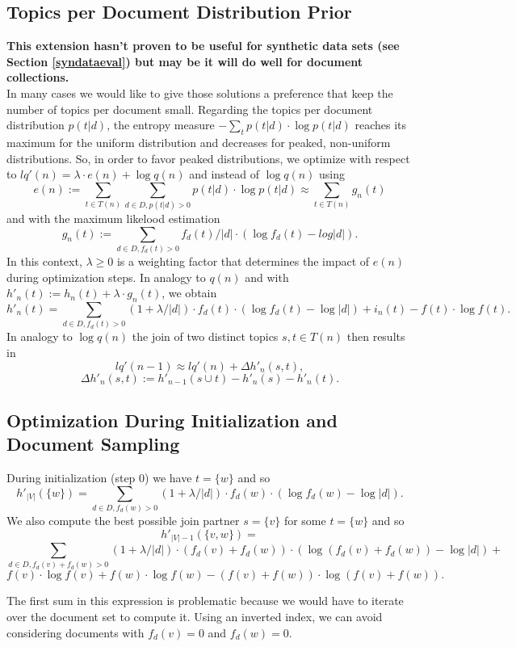 \documentclass[10pt, a4paper, oneside]{article}
\begin{document}
\subsection{Topics per Document Distribution Prior}
\textbf{This extension hasn't proven to be useful for synthetic data sets (see Section \ref{syndataeval}) but may be it will do well for document collections.}\\
In many cases we would like to give those solutions a preference that keep the number of topics per document small. Regarding the topics per document distribution $p(t|d)$, the entropy measure $- \sum_t p(t|d) \cdot \log p(t|d)$ reaches its maximum for the uniform distribution and decreases for peaked, non-uniform distributions. So, in order to favor peaked distributions, we optimize with respect to $lq'(n) = \lambda \cdot e(n) + \log q(n)$ and instead of $\log q(n)$ using
\[ e(n) := \sum_{t \in T(n)} \sum_{d \in D, p(t | d) > 0} p(t | d) \cdot \log p(t | d) \approx \sum_{t \in T(n)} g_n(t)\]
and with the maximum likelood estimation
\[ g_n(t) :=  \sum_{d \in D, f_d(t) > 0} f_d(t) / |d| \cdot (\log f_d(t) - log |d|).\]
In this context, $\lambda \geq 0$ is a weighting factor that determines the impact of $e(n)$ during optimization steps.
In analogy to $q(n)$ and with $h'_n(t) := h_n(t) + \lambda \cdot g_n(t)$, we obtain
\[ h'_n(t) = \sum_{d \in D, f_d(t) > 0} (1 + \lambda / |d|) \cdot f_d(t) \cdot (\log f_d(t) - \log |d|) + i_n(t) - f(t) \cdot \log f(t).\]
In analogy to $\log q(n)$ the join of two distinct topics $s, t \in T(n)$ then results in
\[ lq'(n-1) \approx lq'(n) + \Delta h'_n(s,t),\]  
\[\Delta h'_n(s,t) := h'_{n - 1}(s \cup t) - h'_n(s) - h'_n(t).\]

\subsection{Optimization During Initialization and Document Sampling}
During initialization (step 0) we have $t = \{ w \}$ and so
\[ h'_{|V|}(\{w\}) = \sum_{d \in D, f_d(w) > 0} (1 + \lambda / |d|) \cdot f_d(w) \cdot (\log f_d(w) - \log |d|).\]
We also compute the best possible join partner $s = \{ v \}$ for some $t = \{ w \}$ and so 
\[ h'_{|V| - 1}(\{ v, w \}) = \]
\[\sum_{d \in D, f_d(v) + f_d(w) > 0} (1 + \lambda / |d|) \cdot (f_d(v) + f_d(w)) \cdot (\log (f_d(v) + f_d(w)) - \log |d|) + \]
\[f(v) \cdot \log f(v) + f(w) \cdot \log f(w) - (f(v) + f(w)) \cdot \log (f(v) + f(w)).\]

The first sum in this expression is problematic because we would have to iterate over the document set to compute it. 
Using an inverted index, we can avoid considering documents with $f_d(v) = 0$ and $f_d(w) = 0$.
\end{document}
